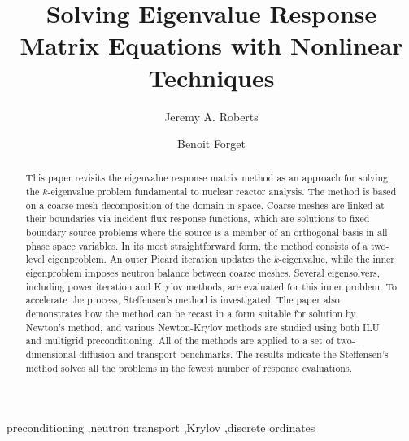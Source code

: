 \documentclass[final, 3p, 10pt]{elsarticle}
\begin{document}
\begin{frontmatter}


\title{Solving Eigenvalue Response Matrix Equations with 
       Nonlinear Techniques}


\author[label1]{Jeremy A. Roberts}
\author[label2]{Benoit Forget}
\address[label1]{Department of Mechanical and Nuclear Engineering,
                 Kansas State University, 3002 Rathbone Hall, Manhattan, KS 66506, USA}
\address[label2]{Department of Nuclear Science and Engineering, 
                 Massachusetts Institute of Technology,
                 77 Massachusetts Avenue, 24-107, Cambridge, MA 02139, USA}

\begin{abstract}
This paper revisits the eigenvalue response matrix method as an 
approach for solving the $k$-eigenvalue problem fundamental to 
nuclear reactor analysis. The method is based on a
coarse mesh decomposition of the domain in space.  Coarse 
meshes are linked at their boundaries via incident flux 
response functions, which are solutions to fixed boundary 
source problems where the source is a member of an orthogonal
basis in all phase space variables.
In its most straightforward form, the method consists of a two-level 
eigenproblem.  An outer Picard iteration updates the $k$-eigenvalue, 
while the inner eigenproblem  imposes neutron balance between coarse 
meshes.  Several eigensolvers, including power iteration and Krylov 
methods, are evaluated for this inner problem.  To accelerate the 
process, Steffensen's method is investigated.
The paper also demonstrates how the method can be recast in a form suitable
for solution by Newton's method, and various Newton-Krylov
methods are studied using both ILU and multigrid preconditioning.
All of the methods are applied to a set of two-dimensional diffusion
and transport benchmarks.  The results indicate the Steffensen's method
solves all the problems in the fewest number of response evaluations.
\end{abstract}

\begin{keyword}

preconditioning \sep neutron transport \sep Krylov \sep discrete ordinates
\end{keyword}

\end{frontmatter}






%
\end{document}
